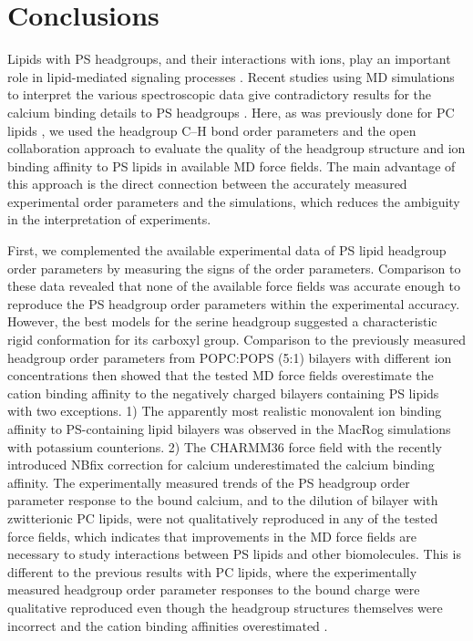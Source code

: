 \documentclass[aps,prl,superscriptaddress,twocolumn]{revtex4}
\begin{document}
\section{Conclusions}
Lipids with PS headgroups, and their interactions with ions,
play an important role in lipid-mediated signaling
processes \cite{leventis10,yeung08}. Recent studies using MD
simulations to interpret the various spectroscopic data
give contradictory results for the calcium binding details to PS
headgroups \cite{melcrova16,valentine18,hallock18}.  
Here, as was previously done for PC lipids \cite{botan15,catte16},
we used the headgroup C--H bond order parameters and the open collaboration approach to evaluate the quality
of the headgroup structure and ion binding affinity to PS lipids
in available MD force fields.
The main advantage of this approach is the direct connection
between the accurately measured experimental order parameters and the simulations,
which reduces the ambiguity in the interpretation of experiments.

First, we complemented the available experimental data of PS
lipid headgroup order parameters \cite{browning80,roux90} by measuring the signs of the order parameters.
Comparison to these data revealed that none of the available force fields
was accurate enough to reproduce the PS
headgroup order parameters within the experimental accuracy. However,
the best models for the serine headgroup suggested a characteristic rigid conformation for its
carboxyl group. Comparison to the previously
measured headgroup order parameters from POPC:POPS (5:1) bilayers with different ion
concentrations \cite{roux90} then showed that the tested MD force fields
overestimate the cation binding affinity to the negatively charged bilayers
containing PS lipids with two exceptions. 1) The apparently most realistic monovalent ion binding
affinity to PS-containing lipid bilayers was observed in the MacRog
simulations with potassium counterions. 2) The CHARMM36 force field with the recently introduced
NBfix correction for calcium \cite{kim16} underestimated the calcium binding affinity.
The experimentally measured trends of the PS headgroup order parameter response
to the bound calcium, and to the dilution of bilayer with zwitterionic PC lipids, were not
qualitatively reproduced in any of the tested force fields, which indicates that improvements in
the MD force fields are necessary to study interactions between PS lipids and other biomolecules.
This is different to the previous results with PC lipids,
where the experimentally measured headgroup order parameter responses to the bound charge
were qualitative reproduced even though the headgroup structures themselves were
incorrect and the cation binding affinities overestimated \cite{catte16}.
\end{document}
